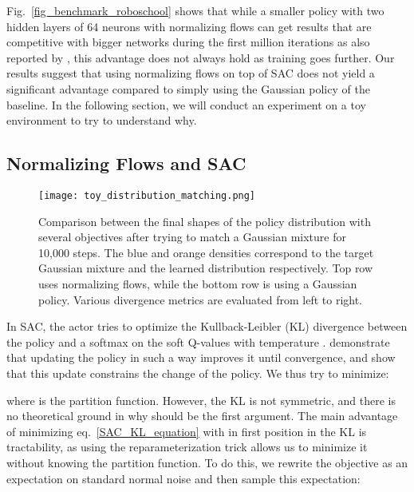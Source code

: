 \documentclass[letterpaper]{article} \usepackage{aaai20}  \usepackage{times}  \usepackage{helvet} \usepackage{courier}  \usepackage[hyphens]{url}  \usepackage{graphicx} \urlstyle{rm} \def\UrlFont{\rm}  \usepackage{graphicx}  \usepackage[section]{placeins}
\begin{document}
Fig.~\ref{fig_benchmark_roboschool} shows that while a smaller policy with two hidden layers of 64 neurons with normalizing flows can get results that are competitive with bigger networks during the first million iterations as also reported by \cite{mazoure2019leveraging}, this advantage does not always hold as training goes further. Our results suggest that using normalizing flows on top of SAC does not yield a significant advantage compared to simply using the Gaussian policy of the baseline. In the following section, we will conduct an experiment on a toy environment to try to understand why.

\subsection{Normalizing Flows and SAC}

\begin{figure*}[h]
\centering
\texttt{[image: toy\_distribution\_matching.png]} \caption{Comparison between the final shapes of the policy distribution with several objectives after trying to match a Gaussian mixture for 10,000 steps. The blue and orange densities correspond to the target Gaussian mixture  and the learned distribution  respectively.
Top row uses normalizing flows, while the bottom row is using a Gaussian policy.
Various divergence metrics are evaluated from left to right.
}
\label{fig_toy_distribution_matching}
\end{figure*}

In SAC, the actor tries to optimize the Kullback-Leibler (KL) divergence between the policy and a softmax on the soft Q-values with temperature . \cite{haarnoja2018soft} demonstrate that updating the policy in such a way improves it until convergence, and \cite{abdolmaleki2018relative} show that this update constrains the change of the policy. We thus try to minimize: 

where  is the partition function. However, the KL is not symmetric, and there is no theoretical ground in why  should be the first argument. The main advantage of minimizing eq.~\ref{SAC_KL_equation} with  in first position in the KL is tractability, as using the reparameterization trick allows us to minimize it without knowing the partition function. To do this, we rewrite the objective as an expectation on standard normal noise  and then sample this expectation: 
\end{document}
